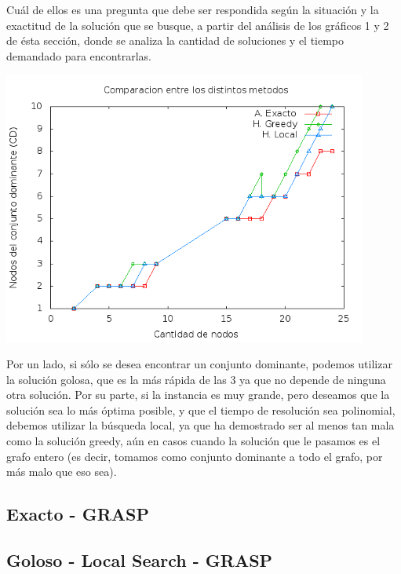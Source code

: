 Cuál de ellos es una pregunta que debe ser respondida según la situación y la exactitud de la solución que se busque, a partir del análisis de los gráficos 1 y 2 de ésta sección, donde se analiza la cantidad de soluciones y el tiempo demandado para encontrarlas. 

\begin{center}
  \includegraphics[width=12cm]{./graficos/local_comparacion_soluciones.png}
\end{center}

Por un lado, si sólo se desea encontrar un conjunto dominante, podemos utilizar la solución golosa, que es la más rápida de las 3 ya que no depende de ninguna otra solución. Por su parte, si la instancia es muy grande, pero deseamos que la solución sea lo más óptima posible, y que el tiempo de resolución sea polinomial, debemos utilizar la búsqueda local, ya que ha demostrado ser al menos tan mala como la solución greedy, aún en casos cuando la solución que le pasamos es el grafo entero (es decir, tomamos como conjunto dominante a todo el grafo, por más malo que eso sea). 

\subsection{Exacto - GRASP}


\subsection{Goloso - Local Search - GRASP}
